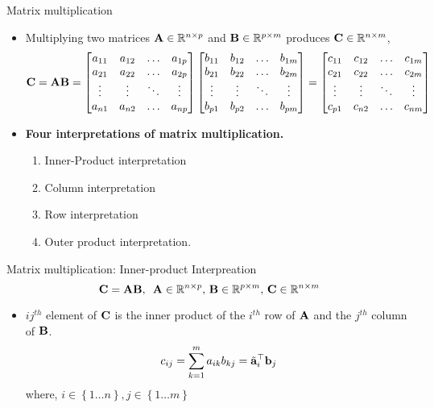 \documentclass[aspectratio=169]{beamer}
\begin{document}
\begin{frame}[t]{Matrix multiplication}
  \begin{itemize}
    \item Multiplying two matrices $\mathbf{A} \in \mathbb{R}^{n \times p}$ and $\mathbf{B} \in \mathbb{R}^{p \times m}$ produces $\mathbf{C} \in \mathbb{R}^{n \times m}$,
    \[ \mathbf{C} = \mathbf{A}\mathbf{B} = \begin{bmatrix}
      a_{11} & a_{12} & \ldots & a_{1p} \\
      a_{21} & a_{22} & \ldots & a_{2p} \\
      \vdots & \vdots & \ddots & \vdots \\
      a_{n1} & a_{n2} & \ldots & a_{np} \\
    \end{bmatrix} \begin{bmatrix}
      b_{11} & b_{12} & \ldots & b_{1m} \\
      b_{21} & b_{22} & \ldots & b_{2m} \\
      \vdots & \vdots & \ddots & \vdots \\
      b_{p1} & b_{p2} & \ldots & b_{pm} \\
    \end{bmatrix} = \begin{bmatrix}
      c_{11} & c_{12} & \ldots & c_{1m} \\
      c_{21} & c_{22} & \ldots & c_{2m} \\
      \vdots & \vdots & \ddots & \vdots \\
      c_{p1} & c_{n2} & \ldots & c_{nm} \\
    \end{bmatrix}\]
    
    \item \textbf{Four interpretations of matrix multiplication.}
    \begin{enumerate}
      \item Inner-Product interpretation
      \item Column interpretation
      \item Row interpretation
      \item Outer product interpretation.
    \end{enumerate} 
  \end{itemize}
\end{frame}

\begin{frame}[t]{Matrix multiplication: Inner-product Interpreation}
  \[ \mathbf{C} = \mathbf{A}\mathbf{B}, \,\,\, \mathbf{A} \in \mathbb{R}^{n \times p}, \, \mathbf{B} \in \mathbb{R}^{p \times m}, \, \mathbf{C} \in \mathbb{R}^{n \times m} \]
  \begin{itemize}
    \item $ij^{th}$ element of $\mathbf{C}$ is the inner product of the $i^{th}$ row of $\mathbf{A}$ and the $j^{th}$ column of $\mathbf{B}$.
    \[ c_{ij} = \sum_{k=1}^{m} a_{ik} b_{kj} = \tilde{\mathbf{a}}_i^{\top}\mathbf{b}_j \]
    where, $i \in \left\{1 \ldots n\right\}, j \in \left\{1 \ldots m\right\}$
  \end{itemize}
\end{frame}
\end{document}
